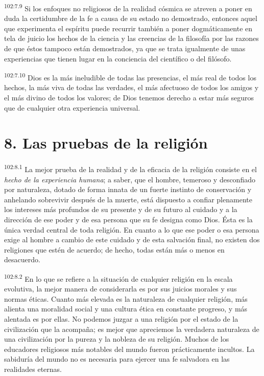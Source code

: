 \documentclass[twoside, 11pt]{book}
\begin{document}
\par
\textsuperscript{102:7.9} Si los enfoques no religiosos de la realidad cósmica se atreven a poner en duda la certidumbre de la fe a causa de su estado no demostrado, entonces aquel que experimenta el espíritu puede recurrir también a poner dogmáticamente en tela de juicio los hechos de la ciencia y las creencias de la filosofía por las razones de que éstos tampoco están demostrados, ya que se trata igualmente de unas experiencias que tienen lugar en la conciencia del científico o del filósofo.

\par
\textsuperscript{102:7.10} Dios es la más ineludible de todas las presencias, el más real de todos los hechos, la más viva de todas las verdades, el más afectuoso de todos los amigos y el más divino de todos los valores; de Dios tenemos derecho a estar más seguros que de cualquier otra experiencia universal.

\section*{8. Las pruebas de la religión}
\par
\textsuperscript{102:8.1} La mejor prueba de la realidad y de la eficacia de la religión consiste en el \textit{hecho de la experiencia humana}; a saber, que el hombre, temeroso y desconfiado por naturaleza, dotado de forma innata de un fuerte instinto de conservación y anhelando sobrevivir después de la muerte, está dispuesto a confiar plenamente los intereses más profundos de su presente y de su futuro al cuidado y a la dirección de ese poder y de esa persona que su fe designa como Dios. Ésta es la única verdad central de toda religión. En cuanto a lo que ese poder o esa persona exige al hombre a cambio de este cuidado y de esta salvación final, no existen dos religiones que estén de acuerdo; de hecho, todas están más o menos en desacuerdo.

\par
\textsuperscript{102:8.2} En lo que se refiere a la situación de cualquier religión en la escala evolutiva, la mejor manera de considerarla es por sus juicios morales y sus normas éticas. Cuanto más elevada es la naturaleza de cualquier religión, más alienta una moralidad social y una cultura ética en constante progreso, y más alentada es por ellas. No podemos juzgar a una religión por el estado de la civilización que la acompaña; es mejor que apreciemos la verdadera naturaleza de una civilización por la pureza y la nobleza de su religión. Muchos de los educadores religiosos más notables del mundo fueron prácticamente incultos. La sabiduría del mundo no es necesaria para ejercer una fe salvadora en las realidades eternas.
\end{document}
